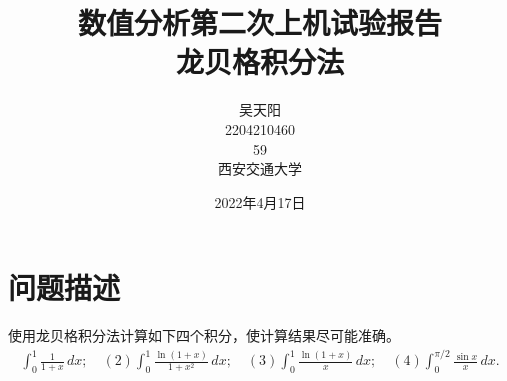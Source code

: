 \documentclass[12pt, a4paper, oneside]{ctexart}
\newcommand{\xiaosihao}{\fontsize{12pt}{\baselineskip}\selectfont}
\begin{document}
\newtheorem{example}{例}             %
\newtheorem{algorithm}{算法}
\newtheorem{theorem}{定理}[section]  %
\newtheorem{definition}{定义}
\newtheorem{axiom}{公理}
\newtheorem{property}{性质}
\newtheorem{proposition}{命题}
\newtheorem{lemma}{引理}
\newtheorem{corollary}{推论}
\newtheorem{remark}{注解}
\newtheorem{condition}{条件}
\newtheorem{conclusion}{结论}
\newtheorem{assumption}{假设}

\renewcommand{\contentsname}{目录}  %
\renewcommand{\abstractname}{摘要}  %
\renewcommand{\refname}{参考文献}   %
\renewcommand{\indexname}{索引}
\renewcommand{\figurename}{图}
\renewcommand{\tablename}{表}
\renewcommand{\appendixname}{附录}
\renewcommand{\algorithm}{算法}


\title{数值分析第二次上机试验报告\\龙贝格积分法}
\author{吴天阳\\2204210460\\59\\[2ex]
\xiaosihao 西安交通大学\\[2ex]
}
\date{2022年4月17日}

\maketitle %
\newpage
\tableofcontents %

\newpage
\section{问题描述}
使用龙贝格积分法计算如下四个积分，使计算结果尽可能准确。
\begin{equation*}
    \begin{aligned}
        \int_0^1\frac{1}{1+x}\,dx;\quad(2)\int_0^1\frac{\ln(1+x)}{1+x^2}\,dx;\quad(3)\int_0^1\frac{\ln(1+x)}{x}\,dx;\quad(4)\int_0^{\pi/2}\frac{\sin x}{x}\,dx.
    \end{aligned}
\end{equation*}
\end{document}
